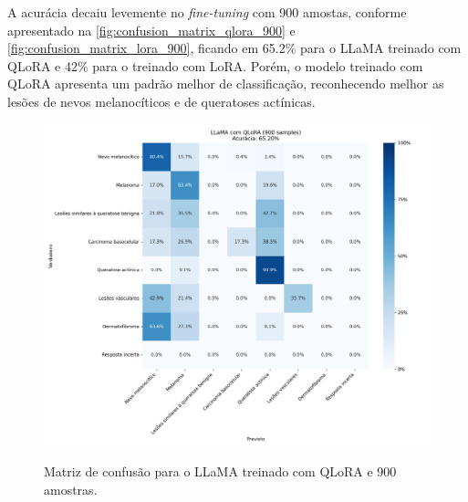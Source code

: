 A acurácia decaiu levemente no \textit{fine-tuning} com 900 amostas, conforme apresentado na \autoref{fig:confusion_matrix_qlora_900} e
\autoref{fig:confusion_matrix_lora_900}, ficando em 65.2\% para o \ac{LLaMA} treinado com \ac{QLoRA} e 42\% para o treinado com \ac{LoRA}. Porém, o modelo treinado com
\ac{QLoRA} apresenta um padrão melhor de classificação, reconhecendo melhor as lesões de nevos melanocíticos e de queratoses actínicas.

\clearpage

\begin{figure}[ht]
    \centering
    \caption{\small Matriz de confusão para o \ac{LLaMA} treinado com \ac{QLoRA} e 900 amostras.}
    \includegraphics[width=1\columnwidth,keepaspectratio]{images/confusion_matrix_qlora_900.png}
    \label{fig:confusion_matrix_qlora_900}
\end{figure}

\clearpage

